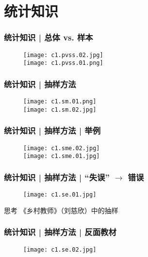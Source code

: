 \section{统计知识}
\begin{frame}
  \frametitle{统计知识 | 总体 vs. 样本}
  \begin{figure}
    \centering
    \texttt{[image: c1.pvss.02.jpg]}\\
    \vspace{0.5em}
    \texttt{[image: c1.pvss.01.png]}
  \end{figure}
\end{frame}

\begin{frame}
  \frametitle{统计知识 | 抽样方法}
  \begin{figure}
    \centering
    \texttt{[image: c1.sm.01.png]}\\
    \vspace{0.5em}
    \texttt{[image: c1.sm.02.jpg]}
  \end{figure}
\end{frame}

\begin{frame}
  \frametitle{统计知识 | 抽样方法 | 举例}
  \begin{figure}
    \centering
    \texttt{[image: c1.sme.02.jpg]}\\
    \vspace{0.5em}
    \texttt{[image: c1.sme.01.jpg]}
  \end{figure}
\end{frame}

\begin{frame}
  \frametitle{统计知识 | 抽样方法 | “失误” $\rightarrow$ 错误}
  \begin{figure}
    \centering
    \texttt{[image: c1.se.01.jpg]}
  \end{figure}
  \pause
  \begin{block}{思考}
    《乡村教师》（刘慈欣）中的抽样
  \end{block}
\end{frame}

\begin{frame}
  \frametitle{统计知识 | 抽样方法 | 反面教材}
  \begin{figure}
    \centering
    \texttt{[image: c1.se.02.jpg]}
  \end{figure}
\end{frame}

